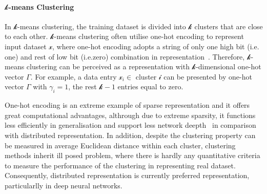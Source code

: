 \paragraph{$\mathcal{k}$-means Clustering}
In $\mathcal{k}$-means clustering, the training dataset is divided into $\mathcal{k}$ clusters that are close to each other.  $\mathcal{k}$-means clustering often utilise one-hot encoding to represent input dataset $\mathcal{x}$, where one-hot encoding adopts a string of only one high bit (i.e. one) and rest of low bit (i.e.zero) combination in representation~\cite{Harris:2012:DDC:2381028}. Therefore, $\mathcal{k}$-means clustering can be perceived as a representation with $\mathcal{k}$-dimensional one-hot vector $\Gamma$. For example, a data entry $\mathcal{x}_i \in$ cluster $\mathcal{i}$ can be presented by one-hot vector $\Gamma$ with $\gamma_i = 1$, the rest $\mathcal{k}-1$ entries equal to zero.
\par 
One-hot encoding is an extreme example of sparse representation and it offers great computational advantages, althrough due to extreme sparsity, it functions less efficiently in generalisation and support less network deepth~\cite{LeCun_2015} in comparison with distributed representation. In addition, despite the clustering property can be measured in average Euclidean distance within each cluster, clustering methods inherit ill posed problem, where there is hardly any quantitative criteria to measure the performance of the clustering in representing real dataset.  Consequently, distributed representation is currently preferred representation, particularlly in deep neural networks. 